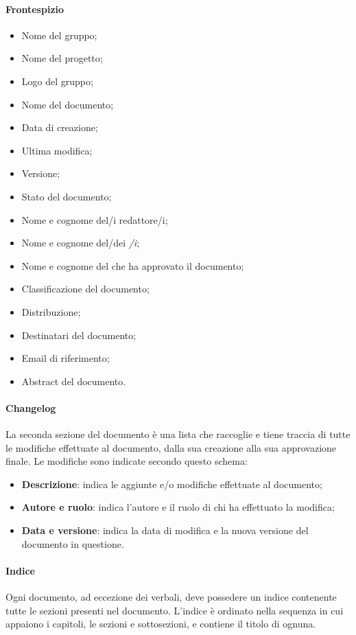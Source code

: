 			\paragraph{Frontespizio}
			\begin{itemize}
				\item{Nome del gruppo;}
				\item{Nome del progetto;}
				\item{Logo del gruppo;}
				\item{Nome del documento;}
				\item{Data di creazione;}
				\item{Ultima modifica;}
				\item{Versione;}
				\item{Stato del documento;}
				\item{Nome e cognome del/i redattore/i;}
				\item{Nome e cognome del/dei \textit{\Ver/i};}
				\item{Nome e cognome del \textit{\RdP} che ha approvato il documento;}
				\item{Classificazione del documento;}
				\item{Distribuzione;}
				\item{Destinatari del documento;}
				\item{Email di riferimento;}
				\item{Abstract del documento.}
			\end{itemize}
	
			\paragraph{Changelog}
			La seconda sezione del documento è una lista che raccoglie e tiene traccia di tutte le modifiche effettuate al documento, dalla sua creazione alla sua approvazione finale. Le modifiche sono indicate secondo questo schema:
			\begin{itemize}
				\item\textbf{Descrizione}: indica le aggiunte e/o modifiche effettuate al documento;
				\item\textbf{Autore e ruolo}: indica l'autore e il ruolo di chi ha effettuato la modifica;
				\item\textbf{Data e versione}: indica la data di modifica e la nuova versione del documento in questione.
			\end{itemize}	

			\paragraph{Indice}
			Ogni documento, ad eccezione dei verbali, deve possedere un indice contenente tutte le sezioni presenti nel documento. L'indice è ordinato nella sequenza in cui appaiono i capitoli, le sezioni e sottosezioni, e contiene il titolo di ognuna. 

